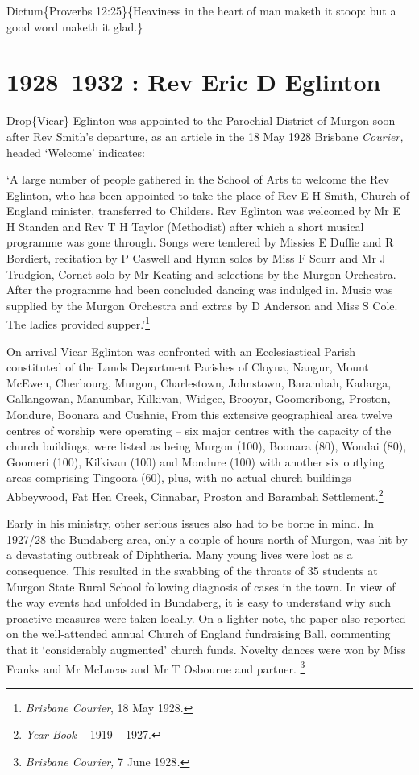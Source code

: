 Dictum\{Proverbs 12:25\}\{Heaviness in the heart of man maketh it stoop: but a good word maketh it glad.\}

\hypertarget{rev-eric-d-eglinton}{%
\chapter{1928--1932 : Rev Eric D Eglinton}\label{rev-eric-d-eglinton}}

Drop\{Vicar\} Eglinton was appointed to the Parochial District of Murgon soon after Rev Smith's departure, as an article in the 18 May 1928 Brisbane \emph{Courier,} headed `Welcome' indicates:

`A large number of people gathered in the School of Arts to welcome the Rev Eglinton, who has been appointed to take the place of Rev E H Smith, Church of England minister, transferred to Childers. Rev Eglinton was welcomed by Mr E H Standen and Rev T H Taylor (Methodist) after which a short musical programme was gone through. Songs were tendered by Missies E Duffie and R Bordiert, recitation by P Caswell and Hymn solos by Miss F Scurr and Mr J Trudgion, Cornet solo by Mr Keating and selections by the Murgon Orchestra. After the programme had been concluded dancing was indulged in. Music was supplied by the Murgon Orchestra and extras by D Anderson and Miss S Cole. The ladies provided supper.'\footnote{\emph{Brisbane Courier}, 18 May 1928.}

On arrival Vicar Eglinton was confronted with an Ecclesiastical Parish constituted of the Lands Department Parishes of Cloyna, Nangur, Mount McEwen, Cherbourg, Murgon, Charlestown, Johnstown, Barambah, Kadarga, Gallangowan, Manumbar, Kilkivan, Widgee, Brooyar, Goomeribong, Proston, Mondure, Boonara and Cushnie, From this extensive geographical area twelve centres of worship were operating -- six major centres with the capacity of the church buildings, were listed as being Murgon (100), Boonara (80), Wondai (80), Goomeri (100), Kilkivan (100) and Mondure (100) with another six outlying areas comprising Tingoora (60), plus, with no actual church buildings - Abbeywood, Fat Hen Creek, Cinnabar, Proston and Barambah Settlement.\footnote{\emph{Year Book --} 1919 -- 1927.}

Early in his ministry, other serious issues also had to be borne in mind. In 1927/28 the Bundaberg area, only a couple of hours north of Murgon, was hit by a devastating outbreak of Diphtheria. Many young lives were lost as a consequence. This resulted in the swabbing of the throats of 35 students at Murgon State Rural School following diagnosis of cases in the town. In view of the way events had unfolded in Bundaberg, it is easy to understand why such proactive measures were taken locally. On a lighter note, the paper also reported on the well-attended annual Church of England fundraising Ball, commenting that it `considerably augmented' church funds. Novelty dances were won by Miss Franks and Mr McLucas and Mr T Osbourne and partner. \footnote{\emph{Brisbane Courier,} 7 June 1928\emph{.}}

